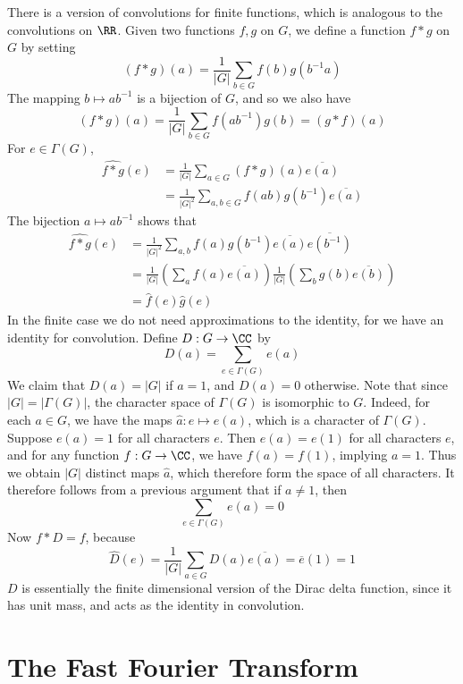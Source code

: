 There is a version of convolutions for finite functions, which is analogous to the convolutions on $\RR$. Given two functions $f,g$ on $G$, we define a function $f * g$ on $G$ by setting
%
\[ (f * g)(a) = \frac{1}{|G|} \sum_{b \in G} f(b) g(b^{-1} a) \]
%
The mapping $b \mapsto ab^{-1}$ is a bijection of $G$, and so we also have
%
\[ (f * g)(a) = \frac{1}{|G|} \sum_{b \in G} f(ab^{-1}) g(b) = (g * f)(a) \]
%
For $e \in \Gamma(G)$,
%
\begin{align*}
    \widehat{f * g}(e) &= \frac{1}{|G|} \sum_{a \in G} (f*g)(a) \overline{e(a)}\\
    &= \frac{1}{|G|^2} \sum_{a,b \in G} f(ab) g(b^{-1}) \overline{e(a)}
\end{align*}
%
The bijection $a \mapsto ab^{-1}$ shows that
%
\begin{align*}
    \widehat{f*g}(e) &= \frac{1}{|G|^2} \sum_{a,b} f(a) g(b^{-1}) \overline{e(a)} \overline{e(b^{-1})}\\
    &= \frac{1}{|G|} \left( \sum_a f(a) \overline{e(a)} \right) \frac{1}{|G|} \left( \sum_b g(b) \overline{e(b)} \right)\\
    &= \widehat{f}(e) \widehat{g}(e)
\end{align*}
%
In the finite case we do not need approximations to the identity, for we have an identity for convolution. Define $D: G \to \CC$ by
%
\[ D(a) = \sum_{e \in \Gamma(G)} e(a) \]
%
We claim that $D(a) = |G|$ if $a = 1$, and $D(a) = 0$ otherwise. Note that since $|G| = |\Gamma(G)|$, the character space of $\Gamma(G)$ is isomorphic to $G$. Indeed, for each $a \in G$, we have the maps $\widehat{a}: e \mapsto e(a)$, which is a character of $\Gamma(G)$. Suppose $e(a) = 1$ for all characters $e$. Then $e(a) = e(1)$ for all characters $e$, and for any function $f: G \to \CC$, we have $f(a) = f(1)$, implying $a = 1$. Thus we obtain $|G|$ distinct maps $\widehat{a}$, which therefore form the space of all characters. It therefore follows from a previous argument that if $a \neq 1$, then
%
\[ \sum_{e \in \Gamma(G)} e(a) = 0 \]
%
Now $f * D = f$, because
%
\[ \widehat{D}(e) = \frac{1}{|G|} \sum_{a \in G} D(a) \overline{e(a)} = \overline{e}(1) = 1 \]
%
$D$ is essentially the finite dimensional version of the Dirac delta function, since it has unit mass, and acts as the identity in convolution.

\section{The Fast Fourier Transform}

